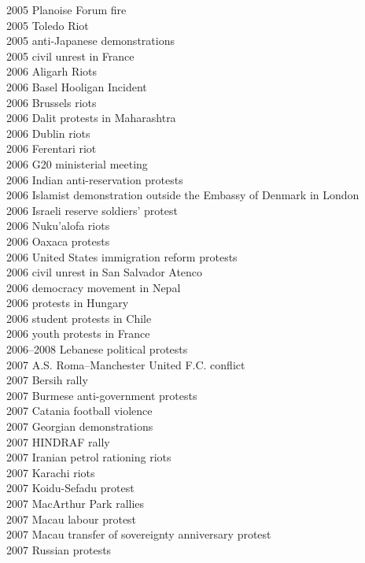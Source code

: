 2005 Planoise Forum fire\\
2005 Toledo Riot\\
2005 anti-Japanese demonstrations\\
2005 civil unrest in France\\
2006 Aligarh Riots\\
2006 Basel Hooligan Incident\\
2006 Brussels riots\\
2006 Dalit protests in Maharashtra\\
2006 Dublin riots\\
2006 Ferentari riot\\
2006 G20 ministerial meeting\\
2006 Indian anti-reservation protests\\
2006 Islamist demonstration outside the Embassy of Denmark in London\\
2006 Israeli reserve soldiers' protest\\
2006 Nuku'alofa riots\\
2006 Oaxaca protests\\
2006 United States immigration reform protests\\
2006 civil unrest in San Salvador Atenco\\
2006 democracy movement in Nepal\\
2006 protests in Hungary\\
2006 student protests in Chile\\
2006 youth protests in France\\
2006–2008 Lebanese political protests\\
2007 A.S. Roma–Manchester United F.C. conflict\\
2007 Bersih rally\\
2007 Burmese anti-government protests\\
2007 Catania football violence\\
2007 Georgian demonstrations\\
2007 HINDRAF rally\\
2007 Iranian petrol rationing riots\\
2007 Karachi riots\\
2007 Koidu-Sefadu protest\\
2007 MacArthur Park rallies\\
2007 Macau labour protest\\
2007 Macau transfer of sovereignty anniversary protest\\
2007 Russian protests\\
